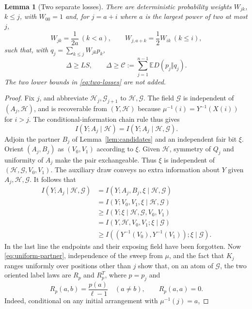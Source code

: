 \documentclass[11pt]{article}
\numberwithin{equation}{section}
\newtheorem{lemma}[theorem]{Lemma}
\theoremstyle{definition}\newtheorem{definition}[theorem]{Definition}
\theoremstyle{remark}\newtheorem{remark}[theorem]{Remark}
\newcommand{\E}{\mathbb E}
\begin{document}
\begin{lemma}[Two separate losses]\label{lem:losses}
There are deterministic probability weights $W_{jk}$, $k\le j$, with
$W_{00}=1$ and, for $j=a+i$ where $a$ is the largest power of two at most
$j$,
\begin{equation}\label{eq:W}
 W_{jk}=\frac1{2a}\ (k<a),
 \qquad W_{j,a+k}=\frac12W_{ik}\ (k\le i),
\end{equation}
such that, with $q_j=\sum_{k\le j}W_{jk}p_k$,
\begin{equation}\label{eq:two-losses}
 \Delta\ge L S,
 \qquad
 \Delta\ge\mathcal C:=\sum_{j=1}^{n-1}\E D(p_j\Vert q_j).
\end{equation}
The two lower bounds in \eqref{eq:two-losses} are not added.
\end{lemma}
\begin{proof}
Fix $j$, and abbreviate $\mathcal H_j,\mathcal G_{j+1}$ to
$\mathcal H,\mathcal G$. The field $\mathcal G$ is independent of
$(A_j,\mathcal H)$, and is recoverable from $(Y,\mathcal H)$ because
$\mu^{-1}(i)=Y^{-1}(X(i))$ for $i>j$. The conditional-information chain
rule thus gives
\[
 I(Y;A_j\mid\mathcal H)=I(Y;A_j\mid\mathcal H,\mathcal G).
\]
Adjoin the partner $B_j$ of Lemma~\ref{lem:candidates} and an independent
fair bit $\xi$. Orient $(A_j,B_j)$ as $(V_0,V_1)$ according to $\xi$.
Given $\mathcal H$, symmetry of $Q_j$ and uniformity of $A_j$ make the
pair exchangeable. Thus $\xi$ is independent of
$(\mathcal H,\mathcal G,V_0,V_1)$. The auxiliary draw conveys no extra
information about $Y$ given $A_j,\mathcal H,\mathcal G$. It follows that
\begin{align*}
 I(Y;A_j\mid\mathcal H,\mathcal G)
 &=I(Y;A_j,B_j,\xi\mid\mathcal H,\mathcal G)\\
 &=I(Y;V_0,V_1,\xi\mid\mathcal H,\mathcal G)\\
 &\ge I(Y;\xi\mid\mathcal H,\mathcal G,V_0,V_1)\\
 &=I(Y,\mathcal H,V_0,V_1;\xi\mid\mathcal G)\\
 &\ge I((Y^{-1}(V_0),Y^{-1}(V_1));\xi\mid\mathcal G).
\end{align*}
In the last line the endpoints and their exposing field have been
forgotten. Now \eqref{eq:uniform-partner}, independence of the sweep from
$\mu$, and the fact that $K_j$ ranges uniformly over positions other than
$j$ show that, on an atom of $\mathcal G$, the two oriented label laws are
$R_p$ and $R_p^T$, where $p=p_j$ and
\[
 R_p(a,b)=\frac{p(a)}{\ell-1}\quad(a\ne b),\qquad R_p(a,a)=0.
\]
Indeed, conditional on any initial arrangement with $\mu^{-1}(j)=a$,

\end{proof}
\end{document}
